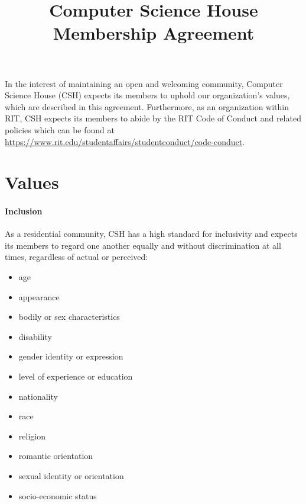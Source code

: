 \documentclass{article}
\title{\vspace{-4em}\textbf{Computer Science House}\\ Membership Agreement}
\author{}
\date{\datechanged}
\begin{document}
\maketitle

\begin{flushleft}
    In the interest of maintaining an open and welcoming community, Computer
    Science House (CSH) expects its members to uphold our organization’s
    values, which are described in this agreement. Furthermore, as an
    organization within RIT, CSH expects its members to abide by the RIT
    Code of Conduct and related policies which can be found at
    \href{https://www.rit.edu/studentaffairs/studentconduct/code-conduct}
    {https://www.rit.edu/studentaffairs/studentconduct/code-conduct}.
\end{flushleft}

\section*{Values}

\paragraph{Inclusion}

As a residential community, CSH has a high standard for inclusivity and
expects its members to regard one another equally and without discrimination
at all times, regardless of actual or perceived:

\begin{multicols}{3}
    \begin{itemize}
        \item age
        \item appearance
        \item bodily or sex characteristics
        \item disability
        \item gender identity or expression
        \item level of experience or education
        \item nationality
        \item race
        \item religion
        \item romantic orientation
        \item sexual identity or orientation
        \item socio-economic status
    \end{itemize}
\end{multicols}
\end{document}
